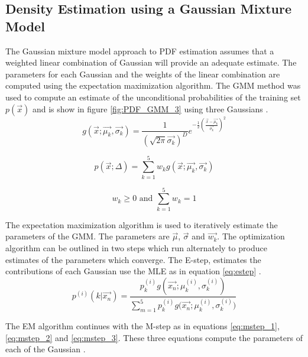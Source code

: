 \documentclass[journal]{IEEEtran}
\begin{document}
\subsection{Density Estimation using a Gaussian Mixture Model}
\par The Gaussian mixture model approach to PDF estimation assumes that a weighted linear combination of Gaussian will provide an adequate estimate. The parameters for each Gaussian and the weights of the linear combination are computed using the expectation maximization algorithm. The GMM method was used to compute an estimate of the unconditional probabilities of the training set \(p(\vec{x})\) and is show in figure \ref{fig:PDF_GMM_3} using three Gaussians \cite{emhandout}.
\begin{equation}
\label{eq:gaussian}
g(\vec{x}; \vec{\mu_k}, \vec{\sigma_k}) = \frac{1}{(\sqrt{2\pi}\vec{\sigma_k})^D} e^{-\frac{1}{2}\left(\frac{\vec{x}-\vec{\mu_k}}{\vec{\sigma_k}}\right)^2}
\end{equation}

\begin{equation}
\label{eq:mixedpdfs}
p(\vec{x}; \Delta) = \sum_{k=1}^{5}{w_k g(\vec{x}; \vec{\mu_k}, \vec{\sigma_k})}
\end{equation}

\begin{equation}
\label{eq:weight_constrains}
w_k \ge 0 \text{   and   } \sum_{k = 1}^{5}{w_k} = 1
\end{equation}

\par The expectation maximization algorithm is used to iteratively estimate the parameters of the GMM. The parameters are \(\vec{\mu}\), \(\vec{\sigma}\) and \(\vec{w_k}\). The optimization algorithm can be outlined in two steps which run alternately to produce estimates of the parameters which converge. The E-step, estimates the contributions of each Gaussian use the MLE as in equation \ref{eq:estep} \cite{carlo}.
\begin{equation}
\label{eq:estep}
p^{(i)}(k|\vec{x_n}) = \frac{p_k^{(i)}g(\vec{x_n};\mu_k^{(i)},\sigma_k^{(i)})}
{\sum_{m=1}^{5}{p_k^{(i)}g(\vec{x_n};\mu_k^{(i)},\sigma_k^{(i)}})}
\end{equation}

\par The EM algorithm continues with the M-step as in equations \ref{eq:mstep_1}, \ref{eq:mstep_2} and \ref{eq:mstep_3}. These three equations compute the parameters of each of the Gaussian \cite{carlo}.
\end{document}
